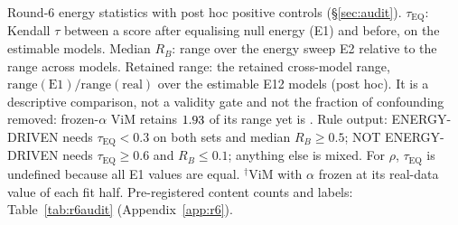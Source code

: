 \documentclass[10pt]{article}
\begin{document}
\begin{table}[H]
\centering\footnotesize

\caption{Round-6 energy statistics with post hoc positive controls (\S\ref{sec:audit}). $\tau_{\mathrm{EQ}}$: Kendall $\tau$ between a score after equalising null energy (E1) and before, on the estimable models. Median $R_B$: range over the energy sweep E2 relative to the range across models. Retained range: the retained cross-model range, $\mathrm{range}(\mathrm{E1})/\mathrm{range}(\mathrm{real})$ over the estimable E12 models (post hoc). It is a descriptive comparison, not a validity gate and not the fraction of confounding removed: frozen-$\alpha$ ViM retains $\RPVimFrMag$ of its range yet is \RPVimFrVerdict. Rule output: ENERGY-DRIVEN needs $\tau_{\mathrm{EQ}}{<}0.3$ on both sets and median $R_B{\ge}0.5$; NOT ENERGY-DRIVEN needs $\tau_{\mathrm{EQ}}{\ge}0.6$ and $R_B{\le}0.1$; anything else is mixed. For $\rho$, $\tau_{\mathrm{EQ}}$ is undefined because all E1 values are equal. $^{\dagger}$ViM with $\alpha$ frozen at its real-data value of each fit half. Pre-registered content counts and labels: Table~\ref{tab:r6audit} (Appendix~\ref{app:r6}).}
\label{tab:r6compact}
\end{table}
\end{document}
